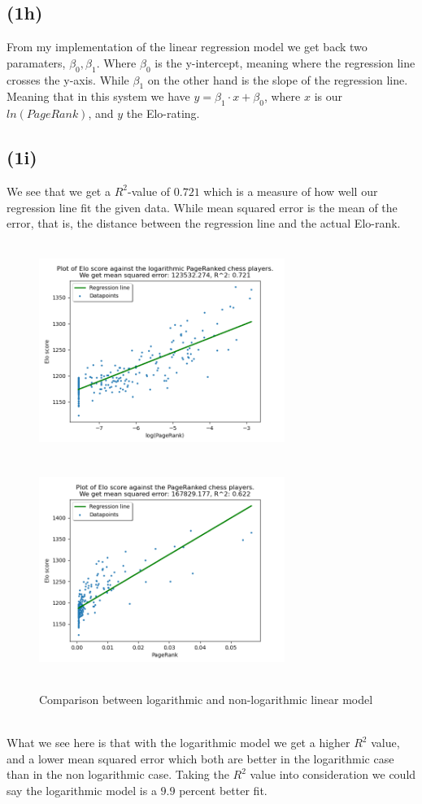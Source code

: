 \documentclass[12pt, letterpaper]{article}
\begin{document}
    \subsection*{(1h)}
      From my implementation of the linear regression model we get back two paramaters, $\beta_0, \beta_1$. Where $\beta_0$ is the y-intercept, meaning where the regression line crosses the y-axis. While $\beta_1$ on the other hand is the slope of the regression line. Meaning that in this system we have $y = \beta_1 \cdot x + \beta_0$, where $x$ is our $ln(PageRank)$, and $y$ the Elo-rating.
    \subsection*{(1i)}
      We see that we get a $R^2$-value of $0.721$ which is a measure of how well our regression line fit the given data. While mean squared error is the mean of the error, that is, the distance between the regression line and the actual Elo-rank.\\
      \begin{figure}[h]
        \caption{Comparison between logarithmic and non-logarithmic linear model}
        \centering
        \includegraphics[width=8cm, height=7cm]{logarithmic}
        \includegraphics[width=8cm, height=7cm]{nonlogarithmic}
      \end{figure}\\
      What we see here is that with the logarithmic model we get a higher $R^2$ value, and a lower mean squared error which both are better in the logarithmic case than in the non logarithmic case. Taking the $R^2$ value into consideration we could say the logarithmic model is a $9.9$ percent better fit.
  \newpage
\end{document}
